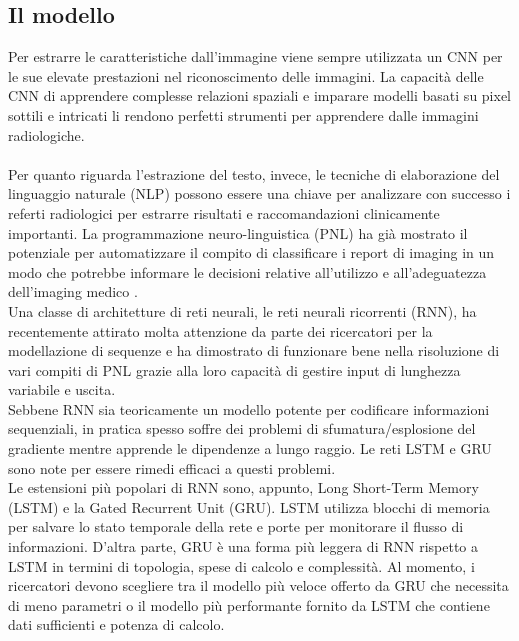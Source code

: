 \documentclass[12pt,a4paper]{report}
\begin{document}
\subsection{Il modello}
Per estrarre le caratteristiche dall’immagine viene sempre utilizzata un CNN per le sue elevate prestazioni nel riconoscimento delle immagini. La capacità delle CNN di apprendere complesse relazioni spaziali e imparare modelli basati su pixel sottili e intricati li rendono perfetti strumenti per apprendere dalle immagini radiologiche. \\
\\
Per quanto riguarda l'estrazione del testo, invece, le tecniche di elaborazione del linguaggio naturale (NLP) possono essere una chiave per analizzare con successo i referti radiologici per estrarre risultati e raccomandazioni clinicamente importanti. La programmazione neuro-linguistica (PNL) ha già mostrato il potenziale per automatizzare il compito di classificare i report di imaging in un modo che potrebbe informare le decisioni relative all'utilizzo e all'adeguatezza dell'imaging medico \cite{banerjee2019comparative}.\\
Una classe di architetture di reti neurali, le reti neurali ricorrenti (RNN), ha recentemente attirato molta attenzione da parte dei ricercatori per la modellazione di sequenze e ha dimostrato di funzionare bene nella risoluzione di vari compiti di PNL grazie alla loro capacità di gestire input di lunghezza variabile e uscita.\\
Sebbene RNN sia teoricamente un modello potente per codificare informazioni sequenziali, in pratica spesso soffre dei problemi di sfumatura/esplosione del gradiente mentre apprende le dipendenze a lungo raggio. Le reti LSTM e GRU sono note per essere rimedi efficaci a questi problemi.\\
Le estensioni più popolari di RNN sono, appunto, Long Short-Term Memory (LSTM) e la Gated Recurrent Unit (GRU).
LSTM utilizza blocchi di memoria per salvare lo stato temporale della rete e porte per monitorare il flusso di informazioni. D'altra parte, GRU è una forma più leggera di RNN rispetto a LSTM in termini di topologia, spese di calcolo e complessità. Al momento, i ricercatori devono scegliere tra il modello più veloce offerto da GRU che necessita di meno parametri o il modello più performante fornito da LSTM che contiene dati sufficienti e potenza di calcolo.\\
\end{document}
